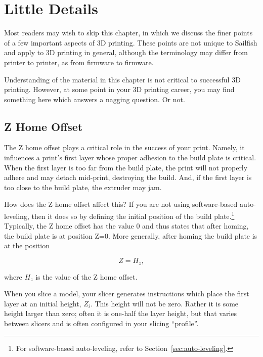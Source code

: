 
\chapter{Little Details} \label{chap:details}

Most readers may wish to skip this chapter, in which we discuss the finer
points of a few important aspects of 3D printing.  These points are not
unique to Sailfish and apply to 3D printing in general, although the
terminology may differ from printer to printer, as from firmware to firmware.

Understanding of the material in this chapter is not critical to successful
3D printing.  However, at some point in your 3D printing career, you may
find something here which answers a nagging question.  Or not.


\section{Z Home Offset} \label{sec:z-home-offset}

The Z home offset plays a critical role in the success of your print.  Namely,
it influences a print's first layer whose proper adhesion to the build plate
is critical.  When the first layer is too far from the build plate,
the print will not properly adhere and may detach mid-print, destroying
the build.  And, if the first layer is too close to the build plate, the
extruder may jam.

How does the Z home offset affect this?  If you are not using
software-based auto-leveling, then it does so by defining the initial
position of the build plate.\footnote{For software-based auto-leveling, refer
to Section~\ref{sec:auto-leveling}.} Typically, the Z home offset has
the value 0 and thus states that after homing, the build plate is at
position Z=0.  More generally, after homing the build plate is at the
position

\begin{equation*}
Z=H_z,
\end{equation*}

where $H_z$ is the value of the Z home offset.

When you slice a model, your slicer generates instructions which place the
first layer at an initial height, $Z_i$.  This height will not be zero.
Rather it is some height larger than zero; often it is one-half the
layer height, but that varies between slicers and is often
configured in your slicing ``profile''.

